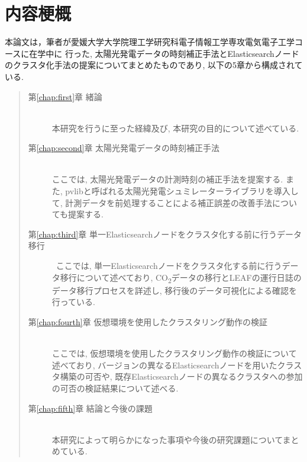 \chapter*{内容梗概}

本論文は，筆者が愛媛大学大学院理工学研究科電子情報工学専攻電気電子工学コースに在学中に
行った, 太陽光発電データの時刻補正手法とElasticsearchノードのクラスタ化手法の提案についてまとめたものであり, 以下の5章から構成されている.\\

\begin{quote}
      \begin{description}

            \item[第\ref{chap:first}章 緒論]\ \\
            本研究を行うに至った経緯及び, 本研究の目的について述べている.
            \vspace{3.0mm}
            
            \item[第\ref{chap:second}章 太陽光発電データの時刻補正手法]\ \\
            ここでは, 太陽光発電データの計測時刻の補正手法を提案する. また, pvlibと呼ばれる太陽光発電シュミレーターライブラリを導入して, 計測データを前処理することによる補正誤差の改善手法についても提案する.
            \vspace{3.0mm}
            
            \item[第\ref{chap:third}章 単一Elasticsearchノードをクラスタ化する前に行うデータ移行]\
            ここでは, 単一Elasticsearchノードをクラスタ化する前に行うデータ移行について述べており, CO\textsubscript{2}データの移行とLEAFの運行日誌のデータ移行プロセスを詳述し, 移行後のデータ可視化による確認を行っている.
            \vspace{3.0mm}
            
            \item[第\ref{chap:fourth}章 仮想環境を使用したクラスタリング動作の検証]\ \\
            ここでは, 仮想環境を使用したクラスタリング動作の検証について述べており, バージョンの異なるElasticsearchノードを用いたクラスタ構築の可否や, 既存Elasticsearchノードの異なるクラスタへの参加の可否の検証結果について述べる.
            \vspace{3.0mm}
            
            \item[第\ref{chap:fifth}章 結論と今後の課題]\ \\
            本研究によって明らかになった事項や今後の研究課題についてまとめている.
      \end{description}
\end{quote}
